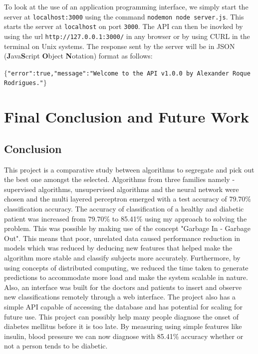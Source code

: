 \documentclass[12pt]{article}
\begin{document}
To look at the use of an application programming interface, we simply start the server at \texttt{localhost:3000} using the command \texttt{nodemon node server.js}. This starts the server at \texttt{localhost} on port \texttt{3000}. The API can then be inovked by using the url \texttt{http://127.0.0.1:3000/} in any browser or by using CURL in the terminal on Unix systems. The response sent by the server will be in JSON (\textbf{J}ava\textbf{S}cript \textbf{O}bject \textbf{N}otation) format as follows:
\begin{center}
$\lbrace$\texttt{"error":true,"message":"Welcome to the API v1.0.0 by Alexander Roque Rodrigues."}$\rbrace$
\end{center}







\clearpage
\newpage
\section{Final Conclusion and Future Work}
\subsection{Conclusion}
This project is a comparative study between algorithms to segregate and pick out the best one amongst the selected. Algorithms from three families namely - supervised algorithms, unsupervised algorithms and the neural network were chosen and the multi layered perceptron emerged with a test accuracy of 79.70\% classification accuracy. The accuracy of classification of a healthy and diabetic patient was increased from 79.70\% to 85.41\% using my approach to solving the problem. This was possible by making use of the concept "Garbage In - Garbage Out". This means that poor, unrelated data caused performance reduction in models which was reduced by deducing new features that helped make the algorithm more stable and classify subjects more accurately. Furthermore, by using concepts of distributed computing, we reduced the time taken to generate predictions to accommodate more load and make the system scalable in nature. Also, an interface was built for the doctors and patients to insert and observe new classifications remotely through a web interface. The project also has a simple API capable of accessing the database and has potential for scaling for future use. This project can possibly help many people diagnose the onset of diabetes mellitus before it is too late. By measuring using simple features like insulin, blood pressure we can now diagnose with 85.41\% accuracy whether or not a person tends to be diabetic.
\end{document}
